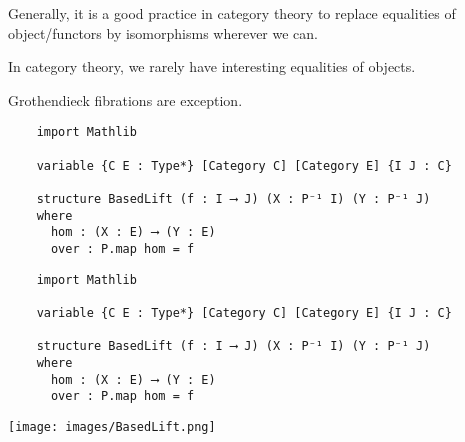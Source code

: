 \documentclass[landscape]{slides}
\begin{document}
\begin{slide}
  \restoregeometry 

Generally, it is a good practice in category theory to replace equalities of object/functors by isomorphisms wherever we can. 

In category theory, we rarely have interesting equalities of objects.
    
Grothendieck fibrations are exception.
  
\end{slide}

\begin{slide}

  \begin{lstlisting}
    import Mathlib

    variable {C E : Type*} [Category C] [Category E] {I J : C}

    structure BasedLift (f : I ⟶ J) (X : P⁻¹ I) (Y : P⁻¹ J) 
    where
      hom : (X : E) ⟶ (Y : E)
      over : P.map hom = f  
  \end{lstlisting}
\end{slide}  


\begin{slide}

  \begin{lstlisting}
    import Mathlib

    variable {C E : Type*} [Category C] [Category E] {I J : C}

    structure BasedLift (f : I ⟶ J) (X : P⁻¹ I) (Y : P⁻¹ J) 
    where
      hom : (X : E) ⟶ (Y : E)
      over : P.map hom = f  
  \end{lstlisting}


  \par{}\baselineskip
  {\color{red}{This specification does not type-check!}}

  \begin{center}
  \texttt{[image: images/BasedLift.png]}
  \end{center}
  
\end{slide}  
\end{document}
